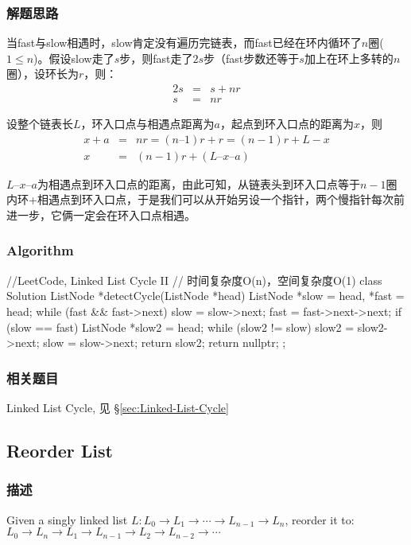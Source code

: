 \subsubsection{解题思路}
当fast与slow相遇时，slow肯定没有遍历完链表，而fast已经在环内循环了$n$圈($1 \leq 
n$)。假设slow走了$s$步，则fast走了$2s$步（fast步数还等于$s$加上在环上多转的$n$圈），设环长为$r$，则：
\begin{eqnarray}
	2s &=& s + nr \nonumber \\
	s &=& nr \nonumber
\end{eqnarray}

设整个链表长$L$，环入口点与相遇点距离为$a$，起点到环入口点的距离为$x$，则
\begin{eqnarray}
	x + a &=& nr = (n – 1)r +r = (n-1)r + L - x \nonumber \\
	x &=& (n-1)r + (L – x – a) \nonumber
\end{eqnarray}

$L – x – 
a$为相遇点到环入口点的距离，由此可知，从链表头到环入口点等于$n-1$圈内环+相遇点到环入口点，于是我们可以从开始另设一个指针，两个慢指针每次前进一步，它俩一定会在环入口点相遇。

\subsubsection{Algorithm}
\begin{Code}
	//LeetCode, Linked List Cycle II
	// 时间复杂度O(n)，空间复杂度O(1)
	class Solution {
		ListNode *detectCycle(ListNode *head) {
			ListNode *slow = head, *fast = head;
			while (fast && fast->next) {
				slow = slow->next;
				fast = fast->next->next;
				if (slow == fast) {
					ListNode *slow2 = head;
					while (slow2 != slow) {
						slow2 = slow2->next;
						slow = slow->next;
					}
					return slow2;
				}
			}
			return nullptr;
		}
	};
\end{Code}


\subsubsection{相关题目}
\begindot
\item Linked List Cycle, 见 \S \ref{sec:Linked-List-Cycle}
\myenddot


\subsection{Reorder List}
\label{sec:Reorder-List}


\subsubsection{描述}
Given a singly linked list $L: L_0 \rightarrow L_1 \rightarrow \cdots 
\rightarrow L_{n-1} \rightarrow L_n$,
reorder it to: $L_0 \rightarrow L_n \rightarrow L_1 \rightarrow L_{n-1} 
\rightarrow L_2 \rightarrow L_{n-2} \rightarrow \cdots$

